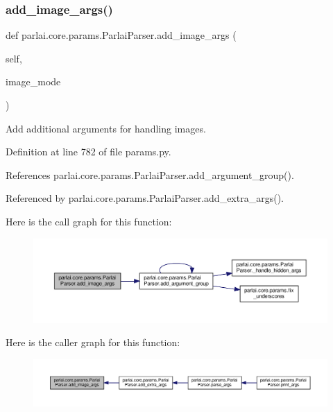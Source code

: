 \subsubsection{\texorpdfstring{add\+\_\+image\+\_\+args()}{add\_image\_args()}}
{\footnotesize\ttfamily def parlai.\+core.\+params.\+Parlai\+Parser.\+add\+\_\+image\+\_\+args (\begin{DoxyParamCaption}\item[{}]{self,  }\item[{}]{image\+\_\+mode }\end{DoxyParamCaption})}

\begin{DoxyVerb}Add additional arguments for handling images.\end{DoxyVerb}
 

Definition at line 782 of file params.\+py.



References parlai.\+core.\+params.\+Parlai\+Parser.\+add\+\_\+argument\+\_\+group().



Referenced by parlai.\+core.\+params.\+Parlai\+Parser.\+add\+\_\+extra\+\_\+args().

Here is the call graph for this function\+:
\nopagebreak
\begin{figure}[H]
\begin{center}
\leavevmode
\includegraphics[width=350pt]{classparlai_1_1core_1_1params_1_1ParlaiParser_a33d186a0cd665df88726b96f1bc3d88e_cgraph}
\end{center}
\end{figure}
Here is the caller graph for this function\+:
\nopagebreak
\begin{figure}[H]
\begin{center}
\leavevmode
\includegraphics[width=350pt]{classparlai_1_1core_1_1params_1_1ParlaiParser_a33d186a0cd665df88726b96f1bc3d88e_icgraph}
\end{center}
\end{figure}
\mbox{\label{classparlai_1_1core_1_1params_1_1ParlaiParser_aed38c7346112f11851969224cb25ad1e}} 

